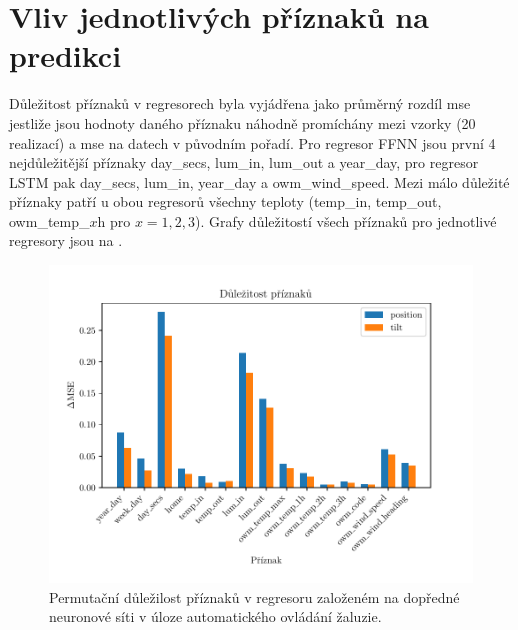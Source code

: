 \section{Vliv jednotlivých příznaků na predikci} \label{sec:res_features}
    Důležitost příznaků v regresorech byla vyjádřena jako průměrný rozdíl \acrshort{mse} jestliže jsou hodnoty daného příznaku náhodně promíchány mezi vzorky (20 realizací) a \acrshort{mse} na datech v původním pořadí. Pro regresor FFNN jsou první 4 nejdůležitější příznaky day\_secs, lum\_in, lum\_out a year\_day, pro regresor LSTM pak day\_secs, lum\_in, year\_day a owm\_wind\_speed. Mezi málo důležité příznaky patří u obou regresorů všechny teploty (temp\_in, temp\_out, owm\_temp\_$x$h pro $x=1,2,3$). Grafy důležitostí všech příznaků pro jednotlivé regresory jsou na .
    \begin{figure}[H]
        \centering
        \includegraphics[draft=false,width=\textwidth]{img/results/pfi_ffnn.pdf}
        \caption[Důležitost příznaků FFNN]{Permutační důležilost příznaků v regresoru založeném na dopředné neuronové síti v úloze automatického ovládání žaluzie.}
        \label{fig:pfi_ffnn}
    \end{figure}
